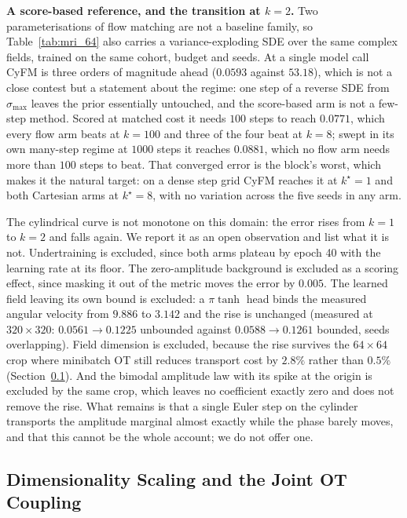 \textbf{A score-based reference, and the transition at $k=2$.} Two parameterisations of
flow matching are not a baseline family, so Table~\ref{tab:mri_64} also carries a
variance-exploding SDE \citep{song2020score} over the same complex fields, trained on the same
cohort, budget and seeds. At a single model call CyFM is three orders of magnitude ahead
($0.0593$ against $53.18$), which is not a close contest but a statement about the regime: one
step of a reverse SDE from $\sigma_{\max}$ leaves the prior essentially untouched, and the
score-based arm is not a few-step method. Scored at matched cost it needs $100$ steps to reach
$0.0771$, which every flow arm beats at $k=100$ and three of the four beat at $k=8$; swept in its own many-step regime at $1000$ steps it reaches $0.0881$, which no flow arm needs more than $100$ steps to beat. That converged error is the block's worst, which makes it the natural target: on a dense step grid CyFM reaches it at $k^\star = 1$ and both Cartesian arms at $k^\star = 8$, with no variation across the five seeds in any arm.

The cylindrical curve is not monotone on this domain: the error rises from $k=1$ to $k=2$ and
falls again. We report it as an open observation and list what it is not. Undertraining is
excluded, since both arms plateau by epoch 40 with the learning rate at its floor. The
zero-amplitude background is excluded as a scoring effect, since masking it out of the metric
moves the error by $0.005$. The learned field leaving its own bound is excluded: a $\pi\tanh$
head binds the measured angular velocity from $9.886$ to $3.142$ and the rise is unchanged
(measured at $320\times320$: $0.0561 \to 0.1225$ unbounded against $0.0588 \to 0.1261$ bounded, seeds overlapping). Field dimension is
excluded, because the rise survives the $64\times64$ crop where minibatch OT still reduces
transport cost by $2.8\%$ rather than $0.5\%$ (Section~\ref{sec:exp_scaling}). And the bimodal
amplitude law with its spike at the origin is excluded by the same crop, which leaves no
coefficient exactly zero and does not remove the rise. What remains is that a single Euler step
on the cylinder transports the amplitude marginal almost exactly while the phase barely moves,
and that this cannot be the whole account; we do not offer one.

\subsection{Dimensionality Scaling and the Joint OT Coupling}
\label{sec:exp_scaling}

